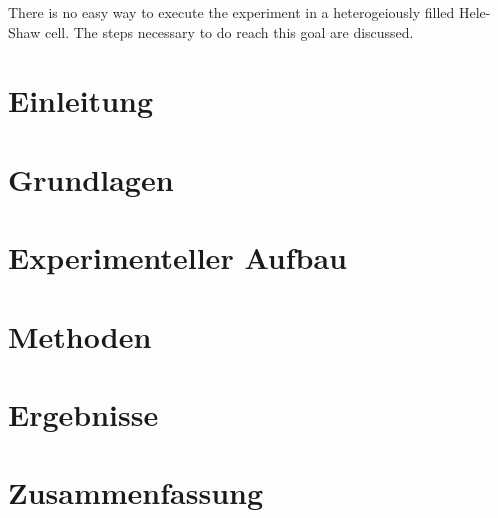 \documentclass[twoside, a4paper, DIV=11,twocolumn]{book}
\begin{document}
  There is no easy way to execute the experiment in a heterogeiously filled Hele-Shaw cell. The steps necessary to do reach this goal are discussed.


\twocolumn
\tableofcontents
\listoffigures

\balance %
\chapter{Einleitung}


\chapter{Grundlagen}


\chapter{Experimenteller Aufbau}


\chapter{Methoden}


\chapter{Ergebnisse}


% 

\chapter{Zusammenfassung}


\onecolumn



\end{document}
